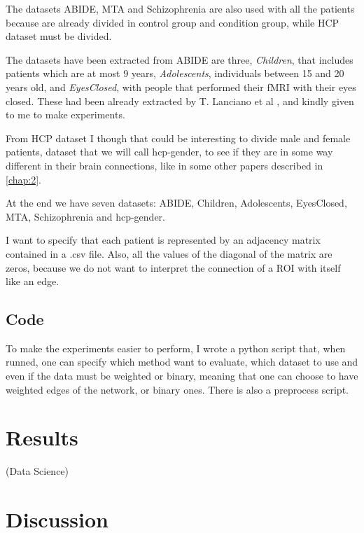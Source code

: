 The datasets ABIDE, MTA and Schizophrenia are also used with all the patients because are already divided in control group and condition group, while HCP dataset must be divided. 

The datasets have been extracted from ABIDE are three, \textit{Children}, that includes patients which are at most 9 years, \textit{Adolescents}, individuals between 15 and 20 years old, and \textit{EyesClosed}, with people that performed their fMRI with their eyes closed. These had been already extracted by T. Lanciano et al \cite{lanciano2020cs}, and kindly given to me to make experiments.

From HCP dataset I though that could be interesting to divide male and female patients, dataset that we will call hcp-gender, to see if they are in some way different in their brain connections, like in some other papers described in \ref{chap:2}. 

At the end we have seven datasets: ABIDE, Children, Adolescents, EyesClosed, MTA, Schizophrenia and hcp-gender. 

I want to specify that each patient is represented by an adjacency matrix contained in a .csv file. Also, all the values of the diagonal of the matrix are zeros, because we do not want to interpret the connection of a ROI with itself like an edge.

\subsection{Code}
To make the experiments easier to perform, I wrote a python script that, when runned, one can specify which method want to evaluate, which dataset to use and even if the data must be weighted or binary, meaning that one can choose to have weighted edges of the network, or binary ones. There is also a preprocess script.



\section{Results}
(Data Science)

\section{Discussion}
\label{sec:moons}